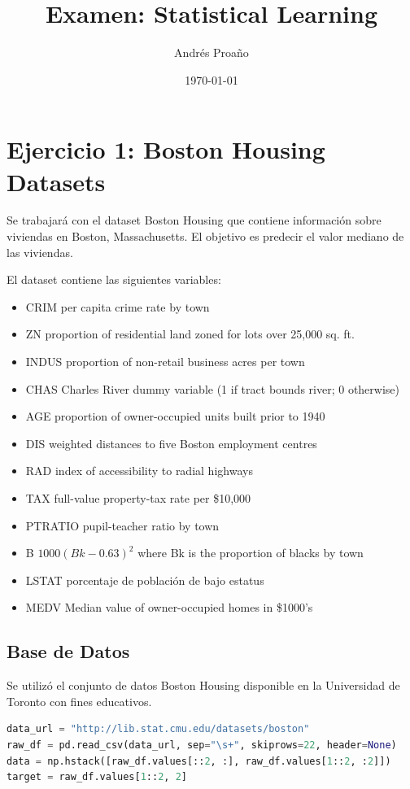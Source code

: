 \documentclass[12pt,a4paper]{article}
\title{\textbf{Examen: Statistical Learning}}
\author{Andrés Proaño}
\date{\today}
\begin{document}
\maketitle

\section{Ejercicio 1: Boston Housing Datasets}

Se trabajará con el dataset Boston Housing que contiene información sobre viviendas en Boston, Massachusetts. El objetivo es predecir el valor mediano de las viviendas.

El dataset contiene las siguientes variables:
\begin{itemize}
\item CRIM     per capita crime rate by town
\item ZN       proportion of residential land zoned for lots over 25,000 sq. ft.
\item INDUS    proportion of non-retail business acres per town
\item CHAS     Charles River dummy variable (1 if tract bounds river; 0 otherwise)
\item  AGE      proportion of owner-occupied units built prior to 1940
\item  DIS      weighted distances to five Boston employment centres
\item  RAD      index of accessibility to radial highways
\item  TAX      full-value property-tax rate per \$10,000
\item  PTRATIO  pupil-teacher ratio by town
\item  B        $1000(Bk - 0.63)^2$ where Bk is the proportion of blacks by town
\item  LSTAT    porcentaje de población de bajo estatus
\item  MEDV     Median value of owner-occupied homes in \$1000's
\end{itemize}


\subsection{Base de Datos}

Se utilizó el conjunto de datos Boston Housing disponible en la Universidad de Toronto con fines educativos.

\begin{lstlisting}[language=Python, frame=single, basicstyle=\ttfamily\small, breaklines=true]
data_url = "http://lib.stat.cmu.edu/datasets/boston"
raw_df = pd.read_csv(data_url, sep="\s+", skiprows=22, header=None)
data = np.hstack([raw_df.values[::2, :], raw_df.values[1::2, :2]])
target = raw_df.values[1::2, 2]
\end{lstlisting}
\end{document}
